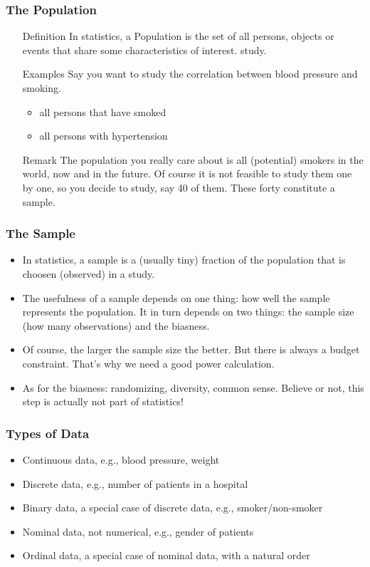 \begin{frame} \frametitle{The Population}
  \begin{itemize}
  \item[Definition] In statistics, a \alert{Population} is the set of all persons, objects or
    events that share some characteristics of interest.
    study.
  \item[Examples] Say you want to study the correlation between blood pressure and smoking.
    \begin{itemize}
    \item all persons that have smoked
    \item all persons with hypertension
    \end{itemize}
  \item[Remark] The population you really care about is \alert{all} (potential)
    smokers in the world, now and in the future. Of course it is not feasible to study
    them one by one, so you decide to study, say 40 of them. These forty constitute a \alert{sample}.
  \end{itemize}
\end{frame}

\begin{frame} \frametitle{The Sample}
  \begin{itemize}
  \item In statistics, a sample is a (usually tiny) fraction of the population that
    is choosen (observed) in a study.
  \item The usefulness of a sample depends on one thing: how well the sample represents
    the population. It in turn depends on two things: the sample size (how many observations) and
    the biasness.
  \item Of course, the larger the sample size the better. But there is always a budget constraint.
    That's why we need a good power calculation.
  \item As for the biasness: randomizing, diversity, common sense. Believe or not, this step is actually
    \alert{not} part of statistics!
  \end{itemize}
\end{frame}

\begin{frame} \frametitle{Types of Data}
  \begin{itemize}
  \item Continuous data, e.g., blood pressure, weight
  \item Discrete data, e.g., number of patients in a hospital
  \item Binary data, a special case of discrete data, e.g., smoker/non-smoker
  \item Nominal data, not numerical, e.g., gender of patients
  \item Ordinal data, a special case of nominal data, with a natural order
  \end{itemize}
\end{frame}

